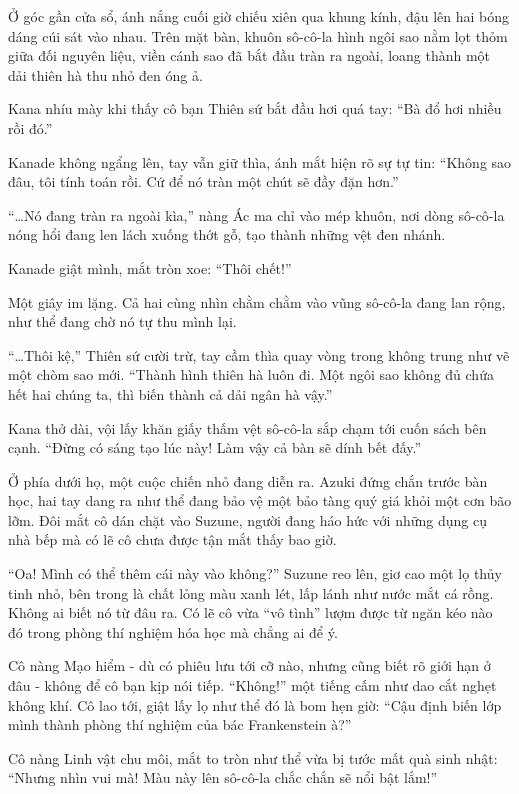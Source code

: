 \documentclass[../main.tex]{subfiles}
\begin{document}
Ở góc gần cửa sổ, ánh nắng cuối giờ chiếu xiên qua khung kính, đậu lên hai bóng dáng cúi sát vào nhau. Trên mặt bàn, khuôn sô-cô-la hình ngôi sao nằm lọt thỏm giữa đối nguyên liệu, viền cánh sao đã bắt đầu tràn ra ngoài, loang thành một dải thiên hà thu nhỏ đen óng ả.

Kana nhíu mày khi thấy cô bạn Thiên sứ bắt đầu hơi quá tay: ``Bà đổ hơi nhiều rồi đó.''

Kanade không ngẩng lên, tay vẫn giữ thìa, ánh mắt hiện rõ sự tự tin: ``Không sao đâu, tôi tính toán rồi. Cứ để nó tràn một chút sẽ đầy đặn hơn.''

``\dots Nó đang tràn ra ngoài kìa,'' nàng Ác ma chỉ vào mép khuôn, nơi dòng sô-cô-la nóng hổi đang len lách xuống thớt gỗ, tạo thành những vệt đen nhánh.

Kanade giật mình, mắt tròn xoe: ``Thôi chết!''

Một giây im lặng. Cả hai cùng nhìn chằm chằm vào vũng sô-cô-la đang lan rộng, như thể đang chờ nó tự thu mình lại.

``\dots Thôi kệ,'' Thiên sứ cười trừ, tay cầm thìa quay vòng trong không trung như vẽ một chòm sao mới. ``Thành hình thiên hà luôn đi. Một ngôi sao không đủ chứa hết hai chúng ta, thì biến thành cả dải ngân hà vậy.''

Kana thở dài, vội lấy khăn giấy thấm vệt sô-cô-la sắp chạm tới cuốn sách bên cạnh. ``Đừng có sáng tạo lúc này! Làm vậy cả bàn sẽ dính bết đấy.''

Ở phía dưới họ, một cuộc chiến nhỏ đang diễn ra. Azuki đứng chắn trước bàn học, hai tay dang ra như thể đang bảo vệ một bảo tàng quý giá khỏi một cơn bão lỡm. Đôi mắt cô dán chặt vào Suzune, người đang háo hức với những dụng cụ nhà bếp mà có lẽ cô chưa được tận mắt thấy bao giờ.

``Oa! Mình có thể thêm cái này vào không?'' Suzune reo lên, giơ cao một lọ thủy tinh nhỏ, bên trong là chất lỏng màu xanh lét, lấp lánh như nước mắt cá rồng. Không ai biết nó từ đâu ra. Có lẽ cô vừa ``vô tình'' lượm được từ ngăn kéo nào đó trong phòng thí nghiệm hóa học mà chẳng ai để ý.

Cô nàng Mạo hiểm - dù có phiêu lưu tới cỡ nào, nhưng cũng biết rõ giới hạn ở đâu - không để cô bạn kịp nói tiếp. ``Không!'' một tiếng cấm như dao cắt nghẹt không khí. Cô lao tới, giật lấy lọ như thể đó là bom hẹn giờ: ``Cậu định biến lớp mình thành phòng thí nghiệm của bác Frankenstein à?''

Cô nàng Linh vật chu môi, mắt to tròn như thể vừa bị tước mất quà sinh nhật: ``Nhưng nhìn vui mà! Màu này lên sô-cô-la chắc chắn sẽ nổi bật lắm!''
\end{document}
